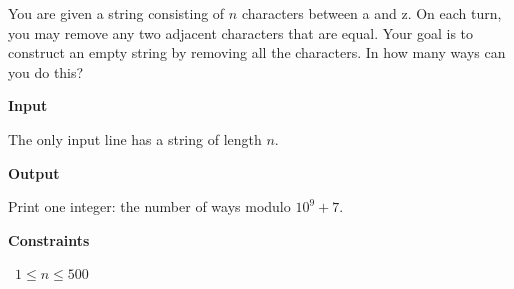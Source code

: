 You are given a string consisting of $n$ characters between a and z.
On each turn, you may remove any two adjacent characters that are equal. Your goal is to construct an empty string by removing all the characters.
In how many ways can you do this?

\vspace{0.3cm}\noindent\textbf{Input}

The only input line has a string of length $n$.

\vspace{0.3cm}\noindent\textbf{Output}

Print one integer: the number of ways modulo $10^9+7$.

\vspace{0.3cm}\noindent\textbf{Constraints}

\textbullet\ $1 \le n \le 500$